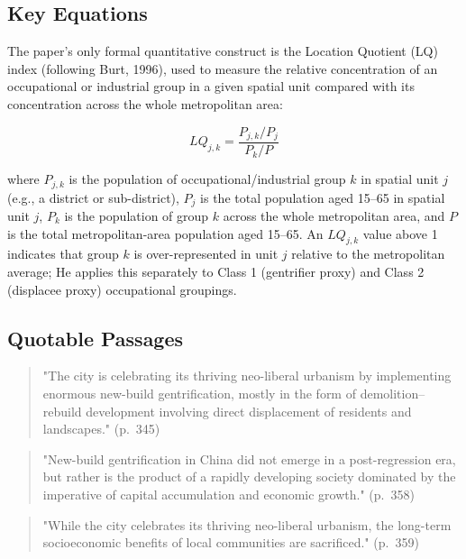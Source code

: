 \subsection*{Key Equations}

The paper's only formal quantitative construct is the Location Quotient (LQ) index (following Burt, 1996), used to measure the relative concentration of an occupational or industrial group in a given spatial unit compared with its concentration across the whole metropolitan area:

\[
LQ_{j,k} = \frac{P_{j,k} / P_{j}}{P_{k} / P}
\]

where $P_{j,k}$ is the population of occupational/industrial group $k$ in spatial unit $j$ (e.g., a district or sub-district), $P_{j}$ is the total population aged 15--65 in spatial unit $j$, $P_{k}$ is the population of group $k$ across the whole metropolitan area, and $P$ is the total metropolitan-area population aged 15--65. An $LQ_{j,k}$ value above 1 indicates that group $k$ is over-represented in unit $j$ relative to the metropolitan average; He applies this separately to Class 1 (gentrifier proxy) and Class 2 (displacee proxy) occupational groupings.

\subsection*{Quotable Passages}

\begin{quote}
"The city is celebrating its thriving neo-liberal urbanism by implementing enormous new-build gentrification, mostly in the form of demolition--rebuild development involving direct displacement of residents and landscapes." (p.~345)
\end{quote}

\begin{quote}
"New-build gentrification in China did not emerge in a post-regression era, but rather is the product of a rapidly developing society dominated by the imperative of capital accumulation and economic growth." (p.~358)
\end{quote}

\begin{quote}
"While the city celebrates its thriving neo-liberal urbanism, the long-term socioeconomic benefits of local communities are sacrificed." (p.~359)
\end{quote}
